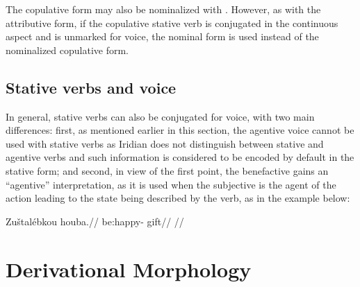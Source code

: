 The copulative form may also be nominalized with . However, as with the attributive form, if the copulative stative verb is conjugated in the continuous aspect and is unmarked for voice, the nominal form is used instead of the nominalized copulative form.

\subsection{Stative verbs and voice}

In general, stative verbs can also be conjugated for voice, with two main differences: first, as mentioned earlier in this section, the agentive voice cannot be used with stative verbs as Iridian does not distinguish between stative and agentive verbs and such information is considered to be encoded by default in the stative form; and second, in view of the first point, the benefactive gains an ``agentive'' interpretation, as it is used when the subjective is the agent of the action leading to the state being described by the verb, as in the example below:

\ex
\begingl
\gla Zuštal\'ebkou houba.//
\glb be:happy- gift//
\glft {}//
\endgl
\xe



\section{Derivational Morphology}
